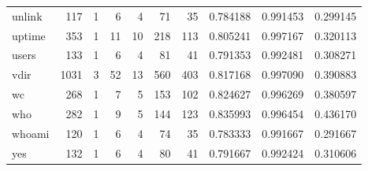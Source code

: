 \begin{tabular}{lrrrrrrrrr}
unlink    &                    117 &                                  1 &                                 6 &                                4 &                                71 &                              35 &                                0.784188 &                               0.991453 &                             0.299145 \\
uptime    &                    353 &                                  1 &                                11 &                               10 &                               218 &                             113 &                                0.805241 &                               0.997167 &                             0.320113 \\
users     &                    133 &                                  1 &                                 6 &                                4 &                                81 &                              41 &                                0.791353 &                               0.992481 &                             0.308271 \\
vdir      &                   1031 &                                  3 &                                52 &                               13 &                               560 &                             403 &                                0.817168 &                               0.997090 &                             0.390883 \\
wc        &                    268 &                                  1 &                                 7 &                                5 &                               153 &                             102 &                                0.824627 &                               0.996269 &                             0.380597 \\
who       &                    282 &                                  1 &                                 9 &                                5 &                               144 &                             123 &                                0.835993 &                               0.996454 &                             0.436170 \\
whoami    &                    120 &                                  1 &                                 6 &                                4 &                                74 &                              35 &                                0.783333 &                               0.991667 &                             0.291667 \\
yes       &                    132 &                                  1 &                                 6 &                                4 &                                80 &                              41 &                                0.791667 &                               0.992424 &                             0.310606 \\
\bottomrule
\end{tabular}
